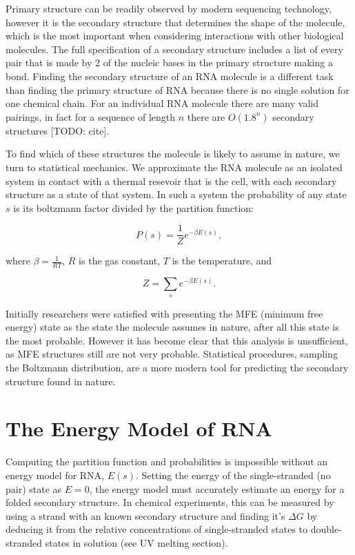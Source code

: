 Primary structure can be readily observed by modern sequencing
technology, however it is the secondary structure that determines the
shape of the molecule, which is the most important when considering
interactions with other biological molecules. The full specification
of a secondary structure includes a list of every pair that is made by
2 of the nucleic bases in the primary structure making a bond. Finding
the secondary structure of an RNA molecule is a different task than
finding the primary structure of RNA because there is no single
solution for one chemical chain. For an individual RNA molecule there
are many valid pairings, in fact for a sequence of length $n$ there
are $O(1.8^n)$ secondary structures [TODO: cite]. 

To find which of these structures the molecule is likely to assume in
nature, we turn to statistical mechanics. We approximate the RNA
molecule as an isolated system in contact with a thermal resevoir that
is the cell, with each secondary structure as a state of that
system. In such a system the probability of any state $s$ is its
boltzmann factor divided by the partition function:

\begin{equation}
P(s) = \frac{1}{Z} e^{-\beta E(s)},
\end{equation}

where $\beta = \frac{1}{RT}$, $R$ is the gas constant, $T$ is the
temperature, and

\begin{equation}
Z = \sum_{s} e^{-\beta E(s)}.
\end{equation}

Initially researchers were satisfied with presenting the MFE (minimum
free energy) state as the state the molecule assumes in nature, after
all this state is the most probable. However it has become clear that
this analysis is unsufficient, as MFE structures still are not very
probable. Statistical procedures, sampling the Boltzmann distribution,
are a more modern tool for predicting the secondary structure found in
nature. 

\section{The Energy Model of RNA}

Computing the partition function and probabilities is impossible
without an energy model for RNA, $E(s)$. Setting the energy of the
single-stranded (no pair) state as $E = 0$, the energy model must
accurately estimate an energy for a folded secondary structure. In
chemical experiments, this can be measured by using a strand with an
known secondary structure and finding it's $\Delta G$ by deducing it
from the relative concentrations of single-stranded states to
double-stranded states in solution (see UV melting section).

